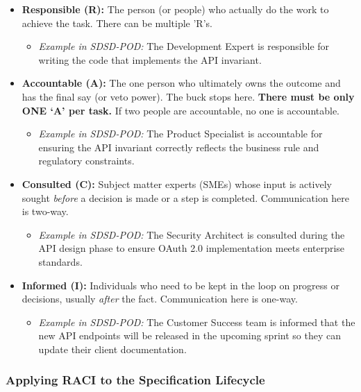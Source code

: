 \begin{itemize}
\tightlist
\item
  \textbf{Responsible (R):} The person (or people) who actually do the
  work to achieve the task. There can be multiple 'R's.

  \begin{itemize}
  \tightlist
  \item
    \emph{Example in SDSD-POD:} The Development Expert is responsible
    for writing the code that implements the API invariant.
  \end{itemize}
\item
  \textbf{Accountable (A):} The one person who ultimately owns the
  outcome and has the final say (or veto power). The buck stops here.
  \textbf{There must be only ONE `A' per task.} If two people are
  accountable, no one is accountable.

  \begin{itemize}
  \tightlist
  \item
    \emph{Example in SDSD-POD:} The Product Specialist is accountable
    for ensuring the API invariant correctly reflects the business rule
    and regulatory constraints.
  \end{itemize}
\item
  \textbf{Consulted (C):} Subject matter experts (SMEs) whose input is
  actively sought \emph{before} a decision is made or a step is
  completed. Communication here is two-way.

  \begin{itemize}
  \tightlist
  \item
    \emph{Example in SDSD-POD:} The Security Architect is consulted
    during the API design phase to ensure OAuth 2.0 implementation meets
    enterprise standards.
  \end{itemize}
\item
  \textbf{Informed (I):} Individuals who need to be kept in the loop on
  progress or decisions, usually \emph{after} the fact. Communication
  here is one-way.

  \begin{itemize}
  \tightlist
  \item
    \emph{Example in SDSD-POD:} The Customer Success team is informed
    that the new API endpoints will be released in the upcoming sprint
    so they can update their client documentation.
  \end{itemize}
\end{itemize}

\subsubsection{Applying RACI to the Specification
Lifecycle}\label{applying-raci-to-the-specification-lifecycle}

